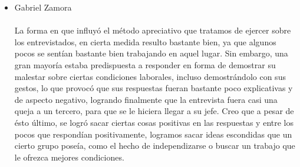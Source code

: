 \begin{itemize}
	\item Gabriel Zamora \\ \\
		La forma en que influyó el método apreciativo que tratamos de ejercer
	sobre los entrevistados, en cierta medida resulto bastante bien, ya que 
	algunos pocos se sentían bastante bien trabajando en aquel lugar. Sin
	embargo, una gran mayoría estaba predispuesta a responder en forma de
	demostrar su malestar sobre ciertas condiciones laborales, incluso 
	demostrándolo con sus gestos, lo que provocó que sus respuestas fueran
	bastante poco explicativas y de aspecto negativo, logrando finalmente
	que la entrevista fuera casi una queja a un tercero, para que se le 
	hiciera llegar a su jefe. Creo que a pesar de ésto último, se logró
	sacar ciertas cosas positivas en las respuestas y entre los pocos que 
	respondían positivamente, logramos sacar ideas escondidas que un cierto
	grupo poseía, como el hecho de independizarse o buscar un trabajo que le
	ofrezca mejores condiciones.


\end{itemize}

